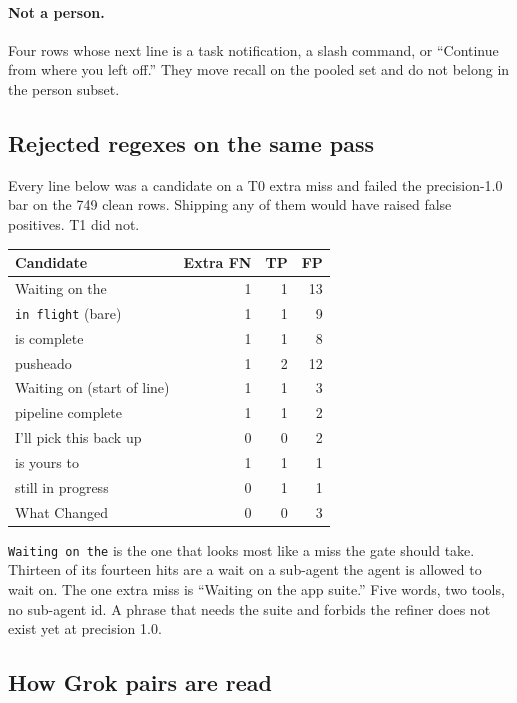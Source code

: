 \paragraph{Not a person.}
Four rows whose next line is a task notification, a slash command, or
``Continue from where you left off.'' They move recall on the pooled
set and do not belong in the person subset.

\subsection{Rejected regexes on the same pass}
\label{app:rejected}

Every line below was a candidate on a T0 extra miss and failed the
precision-1.0 bar on the 749 clean rows. Shipping any of them would
have raised false positives. T1 did not.

\begin{center}
{\small\begin{tabular}{lrrr}
\toprule
Candidate & Extra FN & TP & FP \\
\midrule
Waiting on the & 1 & 1 & 13 \\
\texttt{in flight} (bare) & 1 & 1 & 9 \\
is complete & 1 & 1 & 8 \\
pusheado & 1 & 2 & 12 \\
Waiting on (start of line) & 1 & 1 & 3 \\
pipeline complete & 1 & 1 & 2 \\
I'll pick this back up & 0 & 0 & 2 \\
is yours to & 1 & 1 & 1 \\
still in progress & 0 & 1 & 1 \\
What Changed & 0 & 0 & 3 \\
\bottomrule
\end{tabular}}
\end{center}

\texttt{Waiting on the} is the one that looks most like a miss the
gate should take. Thirteen of its fourteen hits are a wait on a
sub-agent the agent is allowed to wait on. The one extra miss is
``Waiting on the app suite.'' Five words, two tools, no sub-agent
id. A phrase that needs the suite and forbids the refiner does not
exist yet at precision 1.0.

\subsection{How Grok pairs are read}
\label{app:grokread}

